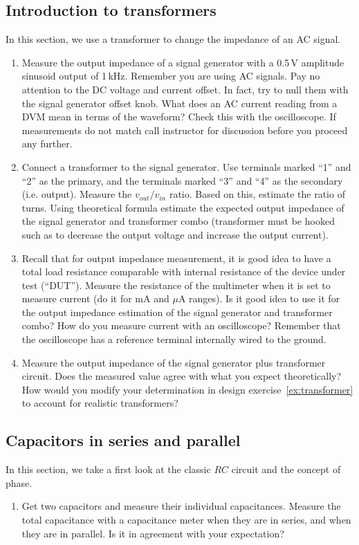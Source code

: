 \documentclass{article}
\begin{document}
\subsection{Introduction to transformers}
In this section, we use a transformer to change the impedance of an AC signal.
\begin{enumerate}
\item Measure the output impedance of a signal generator with a 0.5\,V amplitude sinusoid output of 1\,kHz. Remember you are using AC signals. Pay no attention to the DC voltage and current offset. In fact, try to null them with the signal generator offset knob. What does an AC current reading from a DVM mean in terms of the waveform? Check this with the oscilloscope. If measurements do not match call instructor for discussion before you proceed any further.
\item Connect a transformer to the signal generator. Use terminals marked ``1'' and ``2'' as the primary, and the terminals marked ``3'' and ``4'' as the secondary (i.e. output). Measure the $v_{out}/v_{in}$ ratio. Based on this, estimate the ratio of turns. Using theoretical formula estimate the expected output impedance of the signal generator and transformer combo (transformer must be hooked such as to decrease the output voltage and increase the output current).
\item Recall that for output impedance measurement, it is good idea to have a total load resistance comparable with internal resistance of the device under test (``DUT''). Measure the resistance of the multimeter when it is set to measure current (do it for mA and $\mu$A ranges). Is it good idea to use it for the output impedance estimation of the signal generator and transformer combo? How do you measure current with an oscilloscope? Remember that the oscilloscope has a reference terminal internally wired to the ground.
\item Measure the output impedance of the signal generator plus transformer circuit. Does the measured value agree with what you expect theoretically?  How would you modify your determination in design exercise~\ref{ex:transformer} to account for realistic transformers?
\end{enumerate}

\subsection{Capacitors in series and parallel}
In this section, we take a first look at the classic $RC$ circuit and the concept of phase.
\begin{enumerate}[resume]
\item Get two capacitors and measure their individual capacitances. Measure the total capacitance with a capacitance meter when they are in series, and when they are in parallel. Is it in agreement with your expectation?
\end{enumerate}
\end{document}
